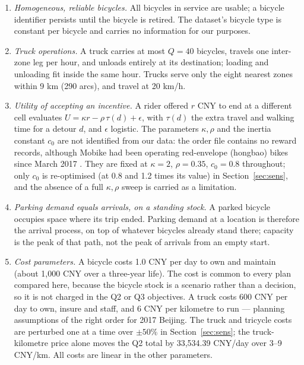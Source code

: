 \begin{enumerate}[label=\textbf{A\arabic*.},leftmargin=2.4em]
\item \emph{Homogeneous, reliable bicycles.} All bicycles in service are usable; a
  bicycle identifier persists until the bicycle is retired. The dataset's bicycle type
  is constant per bicycle and carries no information for our purposes.

\item \emph{Truck operations.} A truck carries at most $Q=40$ bicycles, travels one
  inter-zone leg per hour, and unloads entirely at its destination; loading and
  unloading fit inside the same hour. Trucks serve only the eight nearest zones within
  9 km (290 arcs), and travel at 20 km/h.

\item \emph{Utility of accepting an incentive.} A rider offered $r$ CNY to end at a
  different cell evaluates $U = \kappa r - \rho\,\tau(d) + \epsilon$, with $\tau(d)$
  the extra travel and walking time for a detour $d$, and $\epsilon$ logistic. The
  parameters $\kappa,\rho$ and the inertia constant $c_0$ are not identified from our
  data: the order file contains no reward records, although Mobike had been operating
  red-envelope (hongbao) bikes since March 2017 \cite{technode2017,sixthtone2017}.
  They are fixed at $\kappa=2$, $\rho=0.35$, $c_0=0.8$ throughout; only $c_0$ is
  re-optimised (at 0.8 and 1.2 times its value) in Section~\ref{sec:sens}, and the
  absence of a full $\kappa,\rho$ sweep is carried as a limitation.

\item \emph{Parking demand equals arrivals, on a standing stock.} A parked bicycle
  occupies space where its trip ended. Parking demand at a location is therefore the
  arrival process, on top of whatever bicycles already stand there; capacity is the
  peak of that path, not the peak of arrivals from an empty start.

\item \emph{Cost parameters.} A bicycle costs 1.0 CNY per day to own and maintain
  (about 1{,}000 CNY over a three-year life). The cost is common to every plan compared
  here, because the bicycle stock is a scenario rather than a decision, so it is not
  charged in the Q2 or Q3 objectives. A truck costs 600 CNY per day to own,
  insure and staff, and 6 CNY per kilometre to run --- planning assumptions of the
  right order for 2017 Beijing. The truck and tricycle costs are perturbed one at a time
  over $\pm50\%$ in Section~\ref{sec:sens}; the truck-kilometre price alone moves the
  Q2 total by 33,534.39 CNY/day over 3--9 CNY/km. All costs are linear in the other
  parameters.


\end{enumerate}
